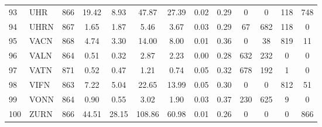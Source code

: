 \documentclass[11pt,a4paper]{article}
\begin{document}
\begin{doublespacing}
\begin{small}
\begin{longtable}{llc|cc|cc|cc|cccc}
                93  & UHR   & 866 & 19.42  & 8.93     & 47.87  & 27.39    & 0.02  & 0.29     & 0     & 0     & 118   & 748   \\
                94  & UHRN  & 867 & 1.65   & 1.87     & 5.46   & 3.67     & 0.03  & 0.29     & 67    & 682   & 118   & 0     \\
                95  & VACN  & 868 & 4.74   & 3.30     & 14.00  & 8.00     & 0.01  & 0.36     & 0     & 38    & 819   & 11    \\
                96  & VALN  & 864 & 0.51   & 0.32     & 2.87   & 2.23     & 0.00  & 0.28     & 632   & 232   & 0     & 0     \\
                97  & VATN  & 871 & 0.52   & 0.47     & 1.21   & 0.74     & 0.05  & 0.32     & 678   & 192   & 1     & 0     \\
                98  & VIFN  & 863 & 7.22   & 5.04     & 22.65  & 13.99    & 0.05  & 0.30     & 0     & 0     & 812   & 51    \\
                99  & VONN  & 864 & 0.90   & 0.55     & 3.02   & 1.90     & 0.03  & 0.37     & 230   & 625   & 9     & 0     \\
                100 & ZURN  & 866 & 44.51  & 28.15    & 108.86 & 60.98    & 0.01  & 0.26     & 0     & 0     & 0     & 866   \\
            \end{longtable}
        \end{small}
    \end{doublespacing}
\end{document}

